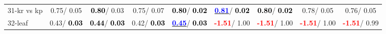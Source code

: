 \begin{table}[h]
\begin{center}
\begin{tabular}{lc|c|c|c|c|c|c|c}
31-kr vs kp &   0.75/  0.05 & \textcolor{black}{\textbf{  0.80}}/  0.03 &   0.75/  0.07 & \textcolor{black}{\textbf{  0.80}}/\textcolor{black}{\textbf{  0.02}} & \underline{\textcolor{blue}{\textbf{  0.81}}}/\textcolor{black}{\textbf{  0.02}} & \textcolor{black}{\textbf{  0.80}}/\textcolor{black}{\textbf{  0.02}} &   0.78/  0.05 &   0.76/  0.05 \\
32-leaf &   0.43/\textcolor{black}{\textbf{  0.03}} & \textcolor{black}{\textbf{  0.44}}/\textcolor{black}{\textbf{  0.03}} &   0.42/\textcolor{black}{\textbf{  0.03}} & \underline{\textcolor{blue}{\textbf{  0.45}}}/\textcolor{black}{\textbf{  0.03}} & \textcolor{red}{\textbf{ -1.51}}/  1.00 & \textcolor{red}{\textbf{ -1.51}}/  1.00 & \textcolor{red}{\textbf{ -1.51}}/  1.00 & \textcolor{red}{\textbf{ -1.51}}/  0.99 \\\end{tabular}\label{stratsALCKappa0bC4.5}
\end{center}
\end{table}
